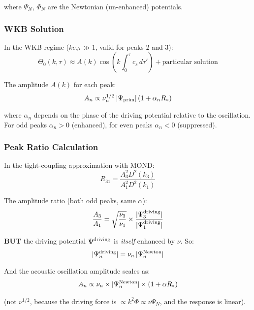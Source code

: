 \documentclass[11pt,a4paper]{article}
\begin{document}
where $\Psi_N$, $\Phi_N$ are the Newtonian (un-enhanced) potentials.

\subsubsection{WKB Solution}

In the WKB regime ($kc_s\tau \gg 1$, valid for peaks 2 and 3):
\begin{equation}
\Theta_0(k, \tau) \approx A(k)\cos\left(k\int_0^\tau c_s\,d\tau'\right) + \text{particular solution}
\end{equation}

The amplitude $A(k)$ for each peak:
\begin{equation}
A_n \propto \nu_n^{1/2}\,|\Psi_{\rm prim}|\,(1 + \alpha_n R_*)
\end{equation}

where $\alpha_n$ depends on the phase of the driving potential relative to the oscillation. For odd peaks $\alpha_n > 0$ (enhanced), for even peaks $\alpha_n < 0$ (suppressed).

\subsubsection{Peak Ratio Calculation}

In the tight-coupling approximation with MOND:
\begin{equation}
R_{31} = \frac{A_3^2 D^2(k_3)}{A_1^2 D^2(k_1)}
\end{equation}

The amplitude ratio (both odd peaks, same $\alpha$):
\begin{equation}
\frac{A_3}{A_1} = \sqrt{\frac{\nu_3}{\nu_1}} \times \frac{|\Psi_3^{\rm driving}|}{|\Psi_1^{\rm driving}|}
\end{equation}

\textbf{BUT} the driving potential $\Psi^{\rm driving}$ is \emph{itself} enhanced by $\nu$. So:
\begin{equation}
|\Psi_n^{\rm driving}| = \nu_n\,|\Psi_n^{\rm Newton}|
\end{equation}

And the acoustic oscillation amplitude scales as:
\begin{equation}
A_n \propto \nu_n \times |\Psi_n^{\rm Newton}| \times (1 + \alpha R_*)
\end{equation}

(not $\nu^{1/2}$, because the driving force is $\propto k^2\Phi \propto \nu\Psi_N$, and the response is linear).
\end{document}

